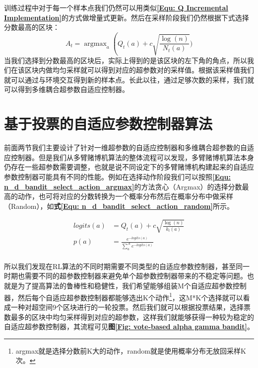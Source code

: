 训练过程中对于每一个样本点我们仍然可以用类似\textbf{\eqref{Equ: Q Incremental Implementation}}的方式做增量式更新。然后在采样阶段我们仍然根据下式选择分数最高的区块：
\begin{equation}
\label{Equ: n_d_bandit_select_action_argmax}
    A_{t}=\operatorname{argmax}_{a}\left(Q_{t}(a)+c \sqrt{\frac{\log (n)}{N_{t}(a)}})\right.
\end{equation}
当我们选择到分数最高的区块后，实际上得到的是该区块的左下角的角点，所以我们在该区块内做均匀采样就可以得到对应的超参数对的采样值。根据该采样值我们就可以通过与环境交互得到新的样本点。长此以往，通过足够次数的采样，我们就可以得到多维耦合超参数自适应控制器。

\section{基于投票的自适应参数控制器算法}

前面两节我们主要设计了针对一维超参数的自适应控制器和多维耦合超参数的自适应控制器。但是我们从多臂赌博机算法的整体流程可以发现，多臂赌博机算法本身仍存在一些超参数需要调整，也就是说不同设定下的多臂赌博机构建起来的自适应参数控制器可能具有不同的性能。例如在选择动作阶段我们可以按照\textbf{\eqref{Equ: n_d_bandit_select_action_argmax}}的方法贪心（Argmax）的选择分数最高的动作，也可将对应的分数转换为一个概率分布然后在概率分布中做采样（Random），如\textbf{式\eqref{Equ: n_d_bandit_select_action_random}}所示。


\begin{equation}
\label{Equ: n_d_bandit_select_action_random}
\begin{aligned}
logits(a) &= Q_{t}(a)+c \sqrt{\frac{\log (n)}{k_{t}(a)}} \\
p(a) &= \frac{e^{-logits(a)}}{\sum_a^{\mathcal{A}} e^{-logits(a)}} \\
\end{aligned}
\end{equation}


所以我们发现在RL算法的不同时期需要不同类型的自适应参数控制器，甚至同一时期也需要不同的超参数控制器来避免单个超参数控制器带来的不稳定等问题。也就是为了提高算法的鲁棒性和稳健性，我们希望能够组装M个自适应超参数控制器，然后每个自适应超参数控制器都能够选出K个动作\footnote{argmax就是选择分数前K大的动作，random就是使用概率分布无放回采样K次。}，这M*K个选择就可以看成一种对超空间9个区块进行的一轮投票。然后我们就可以根据投票结果，选择票数最多的区块中均匀采样得到对应的超参数，这样我们就能够获得一种较为稳定的自适应超参数控制器，其流程可见\textbf{图\ref{Fig: vote-based alpha gamma bandit}}。

